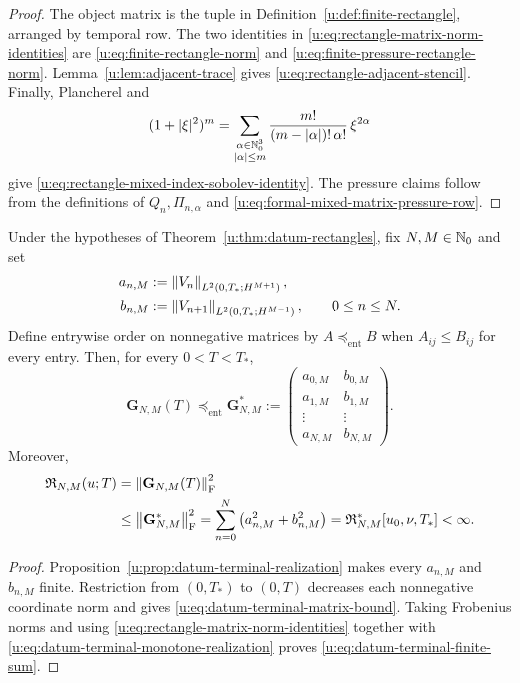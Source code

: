 \begin{proof}
The object matrix is the tuple in Definition~\ref{u:def:finite-rectangle},
arranged by temporal row.  The two identities in
\eqref{u:eq:rectangle-matrix-norm-identities} are
\eqref{u:eq:finite-rectangle-norm} and
\eqref{u:eq:finite-pressure-rectangle-norm}.  Lemma~\ref{u:lem:adjacent-trace}
gives \eqref{u:eq:rectangle-adjacent-stencil}.  Finally, Plancherel and
\[
 (1+|\xi|^2)^m
 =\sum_{\substack{\alpha\in\mathbb N_0^3\\|\alpha|\le m}}
   \frac{m!}{(m-|\alpha|)!\,\alpha!}\,\xi^{2\alpha}
\]
give \eqref{u:eq:rectangle-mixed-index-sobolev-identity}.  The pressure claims
follow from the definitions of \(Q_n,\Pi_{n,\alpha}\) and
\eqref{u:eq:formal-mixed-matrix-pressure-row}.
\end{proof}

\begin{proposition}
\label{u:prop:datum-terminal-matrix-consequence}
Under the hypotheses of Theorem~\ref{u:thm:datum-rectangles}, fix
\(N,M\in\mathbb N_0\) and set
\begin{align}
 a_{n,M}
 &:=\left\lVert V_n\right\rVert_{L^2(0,T_*;H^{M+1})},\notag\\
 b_{n,M}
 &:=\left\lVert V_{n+1}\right\rVert_{L^2(0,T_*;H^{M-1})},
 \qquad 0\le n\le N.
 \label{u:eq:datum-terminal-coordinate-norms}
\end{align}
Define entrywise order on nonnegative matrices by
\(A\preceq_{\mathrm{ent}}B\) when \(A_{ij}\le B_{ij}\) for every entry.
Then, for every \(0<T<T_*\),
\begin{equation}
 \mathbf G_{N,M}(T)
 \preceq_{\mathrm{ent}}
 \mathbf G_{N,M}^*
 :=
 \begin{pmatrix}
  a_{0,M}&b_{0,M}\\
  a_{1,M}&b_{1,M}\\
  \vdots&\vdots\\
  a_{N,M}&b_{N,M}
 \end{pmatrix}.
 \label{u:eq:datum-terminal-matrix-bound}
\end{equation}
Moreover,
\begin{align}
 \mathfrak R_{N,M}(u;T)
 &=\left\lVert \mathbf G_{N,M}(T)\right\rVert_{\mathrm F}^2\notag\\
 &\le\left\lVert \mathbf G_{N,M}^*\right\rVert_{\mathrm F}^2
 =\sum_{n=0}^{N}\left(a_{n,M}^2+b_{n,M}^2\right)
 =\mathfrak R_{N,M}^*[u_0,\nu,T_*]<\infty.
 \label{u:eq:datum-terminal-finite-sum}
\end{align}
\end{proposition}

\begin{proof}
Proposition~\ref{u:prop:datum-terminal-realization} makes every
\(a_{n,M}\) and \(b_{n,M}\) finite.  Restriction from \((0,T_*)\) to
\((0,T)\) decreases each nonnegative coordinate norm and gives
\eqref{u:eq:datum-terminal-matrix-bound}.  Taking Frobenius norms and using
\eqref{u:eq:rectangle-matrix-norm-identities} together with
\eqref{u:eq:datum-terminal-monotone-realization} proves
\eqref{u:eq:datum-terminal-finite-sum}.
\end{proof}
